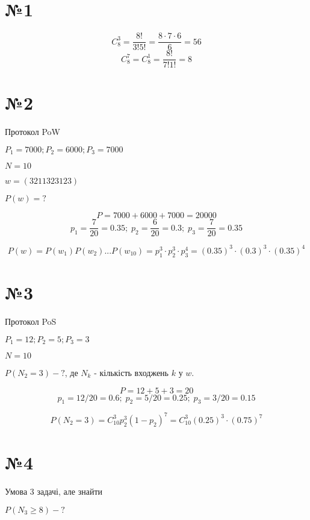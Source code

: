 \documentclass[11pt, a4paper]{article} %
\begin{document}
\section*{№1}

\[C_8^3 = \frac{8!}{3!5!} = \frac{8\cdot 7 \cdot 6}{6} = 56\]
\[C_8^7 = C_8^1 = \frac{8!}{7!1!} = 8\]


\section*{№2}

\begin{mdframed}
    Протокол PoW

    $P_1 = 7000; P_2 = 6000; P_3 = 7000$

    $N = 10$

    $w = (3211323123)$

    $P(w) = ?$
\end{mdframed}

\[P = 7000 + 6000 + 7000 = 20000\]
\[p_1 = \frac{7}{20} = 0.35; \; p_2 = \frac{6}{20} = 0.3; \; p_3 = \frac{7}{20} = 0.35\]

\[P(w) = P(w_1)P(w_2)...P(w_{10}) = p_1^3\cdot p_2^3 \cdot p_3^4 = (0.35)^3 \cdot (0.3)^3 \cdot (0.35)^4\]

\section*{№3}

\begin{mdframed}
    Протокол PoS

    $P_1 = 12; P_2 = 5; P_3 = 3$

    $N=10$

    $P(N_2 = 3) - ?$, де $N_k$ - кількість входжень $k$ у $w$.
\end{mdframed}

\[P = 12+5+3 = 20\]
\[p_1 = 12/20 = 0.6; \; p_2 = 5/20 = 0.25;\; p_3 = 3/20 = 0.15\]

\[P(N_2 = 3) = C_{10}^3 p_2^3 (1-p_2)^7 = C_{10}^3 (0.25)^3 \cdot (0.75)^7\]

\section*{№4}

\begin{mdframed}
Умова 3 задачі, але знайти

$P(N_3 \ge 8) - ?$
\end{mdframed}
\end{document}
